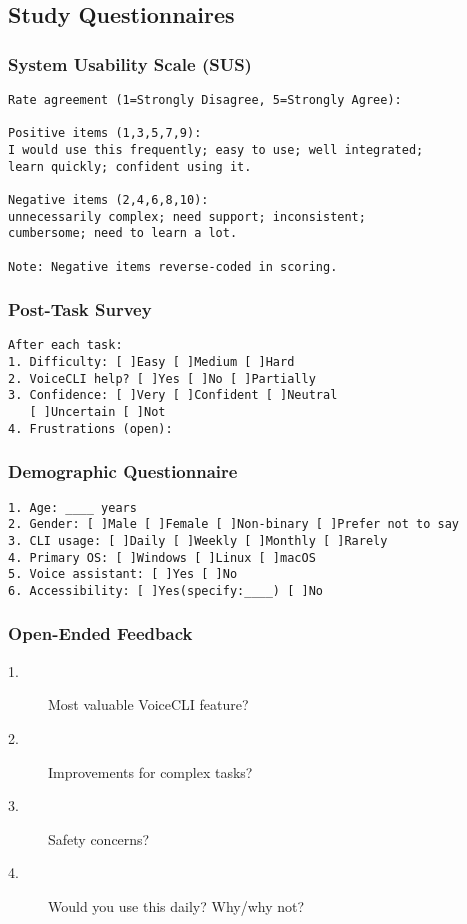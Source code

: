\documentclass[a4paper,12pt]{article}
\begin{document}
\subsection{Study Questionnaires}
\subsubsection{System Usability Scale (SUS)}
\begin{verbatim}
Rate agreement (1=Strongly Disagree, 5=Strongly Agree):

Positive items (1,3,5,7,9): 
I would use this frequently; easy to use; well integrated; 
learn quickly; confident using it.

Negative items (2,4,6,8,10): 
unnecessarily complex; need support; inconsistent; 
cumbersome; need to learn a lot.

Note: Negative items reverse-coded in scoring.
\end{verbatim}

\subsubsection{Post-Task Survey}
\begin{verbatim}
After each task: 
1. Difficulty: [ ]Easy [ ]Medium [ ]Hard
2. VoiceCLI help? [ ]Yes [ ]No [ ]Partially
3. Confidence: [ ]Very [ ]Confident [ ]Neutral 
   [ ]Uncertain [ ]Not
4. Frustrations (open):
\end{verbatim}

\subsubsection{Demographic Questionnaire}
\begin{verbatim}
1. Age: ____ years  
2. Gender: [ ]Male [ ]Female [ ]Non-binary [ ]Prefer not to say
3. CLI usage: [ ]Daily [ ]Weekly [ ]Monthly [ ]Rarely
4. Primary OS: [ ]Windows [ ]Linux [ ]macOS
5. Voice assistant: [ ]Yes [ ]No  
6. Accessibility: [ ]Yes(specify:____) [ ]No
\end{verbatim}

\subsubsection{Open-Ended Feedback}

\begin{description}
\item[1.] {Most valuable VoiceCLI feature?}
\item[2.] {Improvements for complex tasks?}
\item[3.] {Safety concerns?}
\item[4.] {Would you use this daily? Why/why not?}
\end{description}
\end{document}
